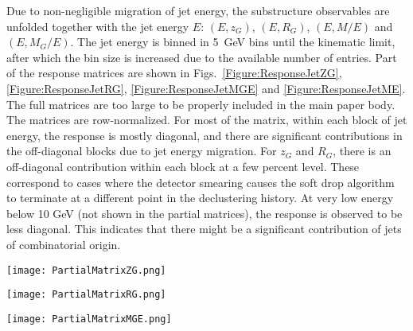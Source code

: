 \documentclass[aps,preprint,superscriptaddress,groupedaddress]{revtex4}  %
\newcommand{\zg}{\ensuremath{z_G}\xspace}
\newcommand{\Rg}{\ensuremath{R_G}\xspace}
\begin{document}
Due to non-negligible migration of jet energy, the substructure observables are unfolded together with the jet energy $E$: $(E, z_G)$, $(E, R_G)$, $(E, M/E)$ and $(E, M_G/E)$.  The jet energy is binned in 5~GeV bins until the kinematic limit, after which the bin size is increased due to the available number of entries.  Part of the response matrices are shown in Figs.~\ref{Figure:ResponseJetZG}, \ref{Figure:ResponseJetRG}, \ref{Figure:ResponseJetMGE}  and \ref{Figure:ResponseJetME}.  The full matrices are too large to be properly included in the main paper body.  The matrices are row-normalized.  For most of the matrix, within each block of jet energy, the response is mostly diagonal, and there are significant contributions in the off-diagonal blocks due to jet energy migration.  For \zg and \Rg, there is an off-diagonal contribution within each block at a few percent level.  These correspond to cases where the detector smearing causes the soft drop algorithm to terminate at a different point in the declustering history.  At very low energy below 10 GeV (not shown in the partial matrices), the response is observed to be less diagonal.  This indicates that there might be a significant contribution of jets of combinatorial origin.
%
\begin{figure*}
    \centering
    \texttt{[image: PartialMatrixZG.png]}
    \caption{Partial response matrix for $z_G$, in bins of jet $E$.  Each block is the sub-matrix for the indicated jet $E$ range.  The matrix is row-normalized across all jet $E$ ranges: the color scale indicates the probability density of a given generator level (``Gen'') jet being smeared into a different reconstructed level (``Reco'') jet.}
    \label{Figure:ResponseJetZG}
\end{figure*}
%
\begin{figure*}
    \centering
    \texttt{[image: PartialMatrixRG.png]}
    \caption{Partial response matrix for $R_G$, in bins of jet $E$.  Each block is the sub-matrix for the indicated jet $E$ range.  The matrix is row-normalized across all jet $E$ ranges: the color scale indicates the probability density of a given generator level (``Gen'') jet being smeared into a different reconstructed level (``Reco'') jet.}
    \label{Figure:ResponseJetRG}
\end{figure*}
%
\begin{figure*}
    \centering
    \texttt{[image: PartialMatrixMGE.png]}
    \caption{Partial response matrix for $M_G/E$, in bins of $E$.  Each block is the sub-matrix for the indicated $E$ range.  The matrix is row-normalized across all $E$ ranges: the color scale indicates the probability density of a given generator level (``Gen'') jet being smeared into a different reconstructed level (``Reco'') jet.}
    \label{Figure:ResponseJetMGE}
\end{figure*}
\end{document}
